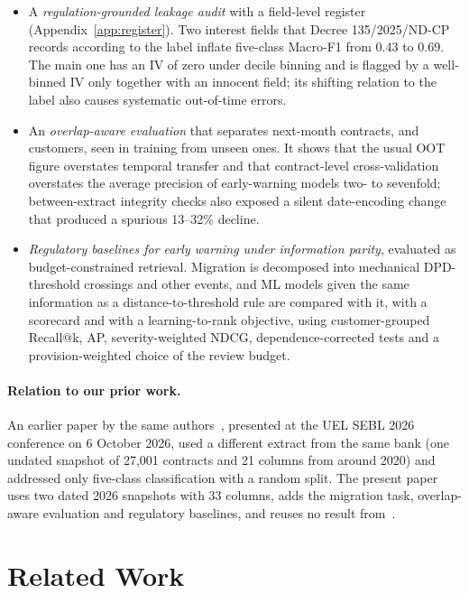 \documentclass[runningheads]{llncs}
\begin{document}
\begin{itemize}
\item[\textbf{C1}] A \emph{regulation-grounded leakage audit} with a field-level register (Appendix~\ref{app:register}). Two interest fields that Decree 135/2025/ND-CP records according to the label inflate five-class Macro-F1 from 0.43 to 0.69. The main one has an IV of zero under decile binning and is flagged by a well-binned IV only together with an innocent field; its shifting relation to the label also causes systematic out-of-time errors.
\item[\textbf{C2}] An \emph{overlap-aware evaluation} that separates next-month contracts, and customers, seen in training from unseen ones. It shows that the usual OOT figure overstates temporal transfer and that contract-level cross-validation overstates the average precision of early-warning models two- to sevenfold; between-extract integrity checks also exposed a silent date-encoding change that produced a spurious 13--32\% decline.
\item[\textbf{C3}] \emph{Regulatory baselines for early warning under information parity}, evaluated as budget-constrained retrieval. Migration is decomposed into mechanical DPD-threshold crossings and other events, and ML models given the same information as a distance-to-threshold rule are compared with it, with a scorecard and with a learning-to-rank objective, using customer-grouped Recall@k, AP, severity-weighted NDCG, dependence-corrected tests and a provision-weighted choice of the review budget.
\end{itemize}

\paragraph{Relation to our prior work.} An earlier paper by the same authors~\cite{an2026sebl}, presented at the UEL SEBL 2026 conference on 6 October 2026, used a different extract from the same bank (one undated snapshot of 27,001 contracts and 21 columns from around 2020) and addressed only five-class classification with a random split. The present paper uses two dated 2026 snapshots with 33 columns, adds the migration task, overlap-aware evaluation and regulatory baselines, and reuses no result from~\cite{an2026sebl}.

\section{Related Work}
\label{sec:related}
\end{document}
